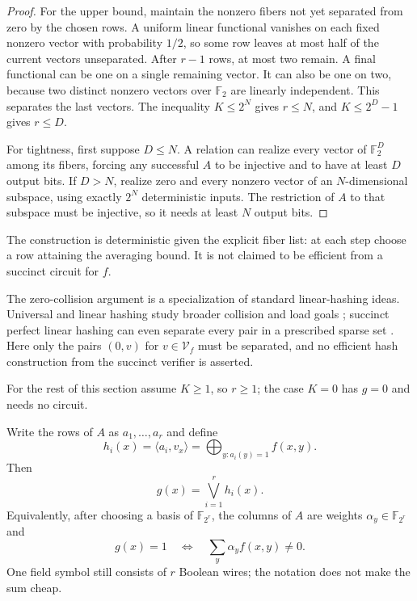 \documentclass[11pt]{article}
\theoremstyle{definition}
\theoremstyle{remark}
\newcommand{\F}{\mathbb F}
\begin{document}
\begin{proof}
For the upper bound, maintain the nonzero fibers not yet separated from zero
by the chosen rows.  A uniform linear functional vanishes on each fixed
nonzero vector with probability $1/2$, so some row leaves at most half of the
current vectors unseparated.  After $r-1$ rows, at most two remain.  A final
functional can be one on a single remaining vector.  It can also be one on
two, because two distinct nonzero vectors over $\F_2$ are linearly
independent.  This separates the last vectors.  The inequality $K\le2^N$
gives $r\le N$, and
$K\le2^D-1$ gives $r\le D$.

For tightness, first suppose $D\le N$.  A relation can realize every vector
of $\F_2^D$ among its fibers, forcing any successful $A$ to be injective and
to have at least $D$ output bits.  If $D>N$, realize zero and every nonzero
vector of an $N$-dimensional subspace, using exactly $2^N$ deterministic
inputs.  The restriction of $A$ to that subspace must be injective, so it
needs at least $N$ output bits.
\end{proof}

The construction is deterministic given the explicit fiber list: at each
step choose a row attaining the averaging bound.  It is not claimed to be
efficient from a succinct circuit for $f$.

The zero-collision argument is a specialization of standard linear-hashing
ideas.  Universal and linear hashing study broader collision and load goals
\cite{CarterWegman1979,AlonEtAl1999}; succinct perfect linear hashing can even
separate every pair in a prescribed sparse set \cite{ChenJinWilliams2019}.
Here only the pairs $(0,v)$ for $v\in\mathcal V_f$ must be separated, and no
efficient hash construction from the succinct verifier is asserted.

For the rest of this section assume $K\ge1$, so $r\ge1$; the case $K=0$ has
$g=0$ and needs no circuit.

Write the rows of $A$ as $a_1,\ldots,a_r$ and define
\[
  h_i(x)=\langle a_i,v_x\rangle
  =\bigoplus_{y:a_i(y)=1}f(x,y).
  \tag{4.3}\label{eq:fingerprint-aggregates}
\]
Then
\[
  g(x)=\bigvee_{i=1}^r h_i(x).
  \tag{4.4}\label{eq:fingerprint-zero-test}
\]
Equivalently, after choosing a basis of $\F_{2^r}$, the columns of $A$ are
weights $\alpha_y\in\F_{2^r}$ and
\[
  g(x)=1
  \quad\Longleftrightarrow\quad
  \sum_y\alpha_y f(x,y)\ne0.
  \tag{4.5}\label{eq:field-fingerprint}
\]
One field symbol still consists of $r$ Boolean wires; the notation does not
make the sum cheap.
\end{document}
